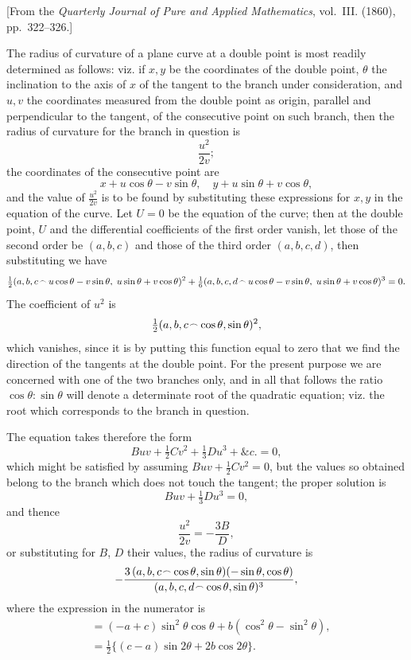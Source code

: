 \documentclass[11pt,a4paper]{article}
\theoremstyle{plain}
\begin{document}
[From the \textit{Quarterly Journal of Pure and Applied Mathematics}, vol.~III. (1860), pp.~322--326.]

The radius of curvature of a plane curve at a double point is most readily determined as follows: viz. if $x, y$ be the coordinates of the double point, $\theta$ the inclination to the axis of $x$ of the tangent to the branch under consideration, and $u, v$ the coordinates measured from the double point as origin, parallel and perpendicular to the tangent, of the consecutive point on such branch, then the radius of curvature for the branch in question is
\[
\frac{u^2}{2v};
\]
the coordinates of the consecutive point are
\[
x + u\cos\theta - v\sin\theta,\quad y + u\sin\theta + v\cos\theta,
\]
and the value of $\frac{u^2}{2v}$ is to be found by substituting these expressions for $x, y$ in the equation of the curve. Let $U = 0$ be the equation of the curve; then at the double point, $U$ and the differential coefficients of the first order vanish, let those of the second order be $(a, b, c)$ and those of the third order $(a, b, c, d)$, then substituting we have
\[
\tfrac{1}{2}(a, b, c \mathbin{\vcenter{\hbox{$\scriptstyle\!\frown$}}} u\cos\theta - v\sin\theta,\; u\sin\theta + v\cos\theta)^2 + \tfrac{1}{6}(a, b, c, d \mathbin{\vcenter{\hbox{$\scriptstyle\!\frown$}}} u\cos\theta - v\sin\theta,\; u\sin\theta + v\cos\theta)^3 = 0.
\]
The coefficient of $u^2$ is
\[
\tfrac{1}{2}(a, b, c \mathbin{\vcenter{\hbox{$\scriptstyle\!\frown$}}} \cos\theta, \sin\theta)^2,
\]
which vanishes, since it is by putting this function equal to zero that we find the direction of the tangents at the double point. For the present purpose we are concerned with one of the two branches only, and in all that follows the ratio $\cos\theta : \sin\theta$ will denote a determinate root of the quadratic equation; viz. the root which corresponds to the branch in question.

The equation takes therefore the form
\[
Buv + \tfrac{1}{2}Cv^2 + \tfrac{1}{3}Du^3 + \&c. = 0,
\]
which might be satisfied by assuming $Buv + \tfrac{1}{2}Cv^2 = 0$, but the values so obtained belong to the branch which does not touch the tangent; the proper solution is
\[
Buv + \tfrac{1}{3}Du^3 = 0,
\]
and thence
\[
\frac{u^2}{2v} = -\frac{3B}{D},
\]
or substituting for $B$, $D$ their values, the radius of curvature is
\[
-\frac{3\,(a, b, c \mathbin{\vcenter{\hbox{$\scriptstyle\!\frown$}}} \cos\theta, \sin\theta)(-\sin\theta, \cos\theta)}{(a, b, c, d \mathbin{\vcenter{\hbox{$\scriptstyle\!\frown$}}} \cos\theta, \sin\theta)^3},
\]
where the expression in the numerator is
\begin{align*}
&= (-a + c)\sin^2\theta\cos\theta + b(\cos^2\theta - \sin^2\theta),\\
&= \tfrac{1}{2}\{(c - a)\sin 2\theta + 2b\cos 2\theta\}.
\end{align*}
\end{document}
